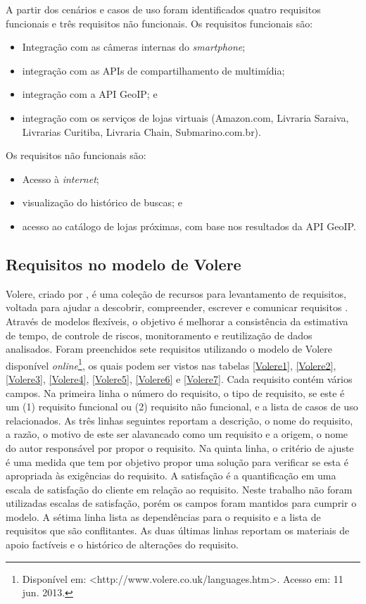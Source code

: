 
A partir dos cenários e casos de uso foram identificados quatro
requisitos funcionais e três requisitos não funcionais.
Os requisitos funcionais são:

\begin{itemize}
\item Integração com as câmeras internas do \emph{smartphone};
\item integração com as APIs de compartilhamento de multimídia;
\item integração com a API GeoIP; e
\item integração com os serviços de lojas virtuais (Amazon.com, Livraria
    Saraiva, Livrarias Curitiba, Livraria Chain, Submarino.com.br).
\end{itemize}

Os requisitos não funcionais são:
\begin{itemize}
\item Acesso à \emph{internet};
\item visualização do histórico de buscas; e
\item acesso ao catálogo de lojas próximas, com base nos resultados
    da API GeoIP.
\end{itemize}

\subsection{Requisitos no modelo de Volere}


Volere, criado por , é uma coleção de recursos
para levantamento de requisitos, voltada para ajudar a descobrir, compreender,
escrever e comunicar requisitos \cite{VolereOverview}.
Através de modelos flexíveis, o objetivo é melhorar a consistência da estimativa de
tempo, de controle de riscos, monitoramento e reutilização de dados 
analisados.  Foram preenchidos sete requisitos utilizando o modelo de Volere 
disponível \emph{online}\footnote{Disponível em:
<http://www.volere.co.uk/languages.htm>. Acesso em: 11 jun. 2013.}, 
os quais podem ser vistos nas 
tabelas \ref{Volere1}, \ref{Volere2}, \ref{Volere3}, \ref{Volere4},
\ref{Volere5}, \ref{Volere6} e \ref{Volere7}.  Cada requisito contém vários
campos.  Na primeira linha o número do requisito, o tipo de requisito, se este 
é um (1) requisito funcional ou (2) requisito não funcional, e a lista de
casos de uso relacionados.   As três linhas seguintes reportam a
descrição, o nome do requisito, a razão, o motivo de este ser alavancado 
como um requisito e a origem, o nome do autor responsável por propor
o requisito.  Na quinta linha, o critério de ajuste é uma medida que tem
por objetivo propor uma solução para verificar se esta é apropriada às exigências
do requisito.  A satisfação é a quantificação em uma escala de satisfação do 
cliente em relação ao requisito.  Neste trabalho não foram utilizadas escalas
de satisfação, porém os campos foram mantidos para cumprir o modelo.  A sétima
linha lista as dependências para o requisito e a lista de requisitos que são
conflitantes.  As duas últimas linhas reportam os materiais de apoio factíveis
e o histórico de alterações do requisito.







\FloatBarrier

